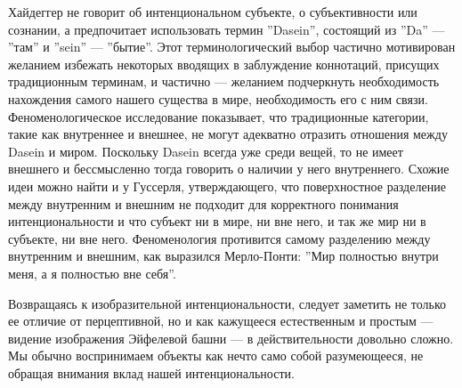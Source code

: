 \documentclass[11pt]{book}
\begin{document}
\relax
{}\relax
\smallskip

Хайдеггер не говорит об интенциональном субъекте, о субъективности или сознании, а предпочитает использовать термин ''Dasein'', состоящий из ''Da'' --- ''там'' и ''sein'' --- ''бытие''. Этот терминологический выбор частично мотивирован желанием избежать некоторых вводящих в заблуждение коннотаций, присущих традиционным терминам, и частично --- желанием подчеркнуть необходимость нахождения самого нашего существа в мире, необходимость его с ним связи. Феноменологическое исследование показывает, что традиционные категории, такие как внутреннее и внешнее, не могут адекватно отразить отношения между Dasein и миром. Поскольку Dasein всегда уже среди вещей, то не имеет внешнего и бессмысленно тогда говорить о наличии у него внутреннего. Схожие идеи можно найти и у Гуссерля, утверждающего, что поверхностное разделение между внутренним и внешним не подходит для корректного понимания интенциональности и что субъект ни в мире, ни вне него, и так же мир ни в субъекте, ни вне него. Феноменология противится самому разделению между внутренним и внешним, как выразился Мерло-Понти: ''Мир полностью внутри меня, а я полностью вне себя''.

Возвращаясь к изобразительной интенциональности, следует заметить не только ее отличие от перцептивной, но и как кажущееся естественным и простым --- видение изображения Эйфелевой башни --- в действительности довольно сложно. Мы обычно воспринимаем объекты как нечто само собой разумеющееся, не обращая внимания вклад нашей интенциональности.
\end{document}
